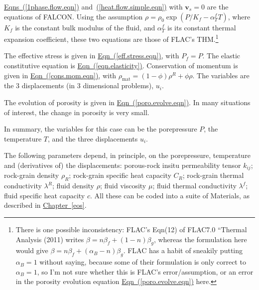 \documentclass[12pt]{report}
\begin{document}
\hyperref[1phase.flow.eqn]{Eqns~(\ref*{1phase.flow.eqn})}
and~\hyperref[heat.flow.simple.eqn]{(\ref*{heat.flow.simple.eqn})}
with ${\mathbf{v}}_{s}=0$ are the equations of FALCON.  Using the
assumption $\rho = \rho_{0}\exp(P/K_{f} - \alpha_{T}^{f}T)$, where
$K_{f}$ is the constant bulk modulus of the fluid, and
$\alpha_{T}^{f}$ is its constant thermal expansion coefficient, these
two equations are those of FLAC's THM.\footnote{There is one possible
  inconsistency: FLAC's Eqn(12) of FLAC7.0 ``Thermal Analysis (2011)
  writes $\beta = n\beta_{f} + (1-n)\beta_{g}$, whereas the
  formulation here would give $\beta = n\beta_{f} +
  (\alpha_{B}-n)\beta_{g}$.  FLAC has a habit of sneakily putting
  $\alpha_{B}=1$ without saying, because some of their formulation is
  only correct to $\alpha_{B}=1$, so I'm not sure whether this is
  FLAC's error/assumption, or an error in the porosity evolution
  equation \hyperref[poro.evolve.eqn]{Eqn~(\ref*{poro.evolve.eqn})}
  here.}

The effective stress is given in
\hyperref[eff.stress.eqn]{Eqn~(\ref*{eff.stress.eqn})}, with
$P_{f}=P$.  The elastic constitutive equation is
\hyperref[eqn.elasticity]{Eqn~(\ref*{eqn.elasticity})}.  Conservation
of momentum is given in
\hyperref[cons.mom.eqn]{Eqn~(\ref*{cons.mom.eqn})}, with
$\rho_{\mathrm{mat}} = (1 - \phi)\rho^{R} + \phi \rho$.  The variables
are the 3 displacements (in 3 dimensional problems), $u_{i}$.

The evolution of porosity is given in
\hyperref[poro.evolve.eqn]{Eqn~(\ref*{poro.evolve.eqn})}.  In many
situations of interest, the change in porosity is very small.

In summary, the variables for this case can be the porepressure $P$,
the temperature $T$, and the three displacements $u_{i}$.

The following parameters depend, in principle, on the porepressure,
temperature and (derivatives of) the displacements: porous-rock insitu
permeability tensor $k_{ij}$; rock-grain density $\rho_{R}$;
rock-grain specific heat capacity $C_{R}$; rock-grain thermal
conductivity $\lambda^{R}$; fluid density $\rho$; fluid viscosity
$\mu$; fluid thermal conductivity $\lambda^{f}$; fluid specific heat
capacity $c$.  All these can be coded into a suite of Materials, as
described in \hyperref[eos]{Chapter~\ref*{eos}}.

\end{document}

